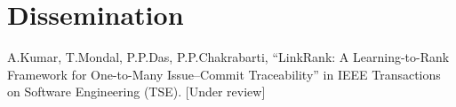 \section{Dissemination}

A.Kumar, T.Mondal, P.P.Das, P.P.Chakrabarti, “LinkRank: A Learning-to-Rank Framework for One-to-Many Issue–Commit Traceability” in IEEE Transactions on Software Engineering (TSE). [Under review]



